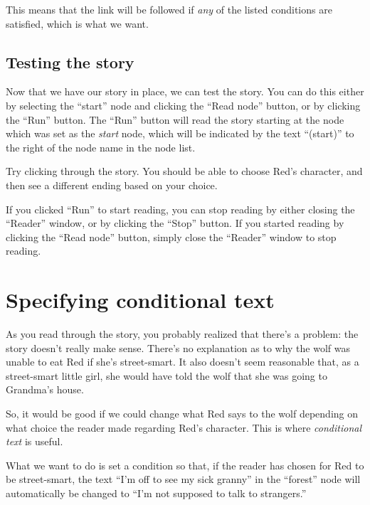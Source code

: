 \documentclass{article}
\begin{document}
This means that the link will be followed if \textit{any} of the listed
conditions are satisfied, which is what we want.

\subsection{Testing the story}

Now that we have our story in place, we can test the story. You can do this
either by selecting the ``start'' node and clicking the ``Read node'' button,
or by clicking the ``Run'' button. The ``Run'' button will read the story
starting at the node which was set as the \textit{start} node, which will be
indicated by the text ``(start)'' to the right of the node name in the node
list.

Try clicking through the story. You should be able to choose Red's character,
and then see a different ending based on your choice.

If you clicked ``Run'' to start reading, you can stop reading by either closing
the ``Reader'' window, or by clicking the ``Stop'' button. If you started
reading by clicking the ``Read node'' button, simply close the ``Reader''
window to stop reading.

\section{Specifying conditional text}

As you read through the story, you probably realized that there's a problem:
the story doesn't really make sense. There's no explanation as to why the wolf
was unable to eat Red if she's street-smart. It also doesn't seem reasonable
that, as a street-smart little girl, she would have told the wolf that she was
going to Grandma's house.

So, it would be good if we could change what Red says to the wolf depending on
what choice the reader made regarding Red's character. This is where
\textit{conditional text} is useful.

What we want to do is set a condition so that, if the reader has chosen for
Red to be street-smart, the text ``I'm off to see my sick granny'' in the
``forest'' node will automatically be changed to ``I'm not supposed to talk to
strangers.''
\end{document}
